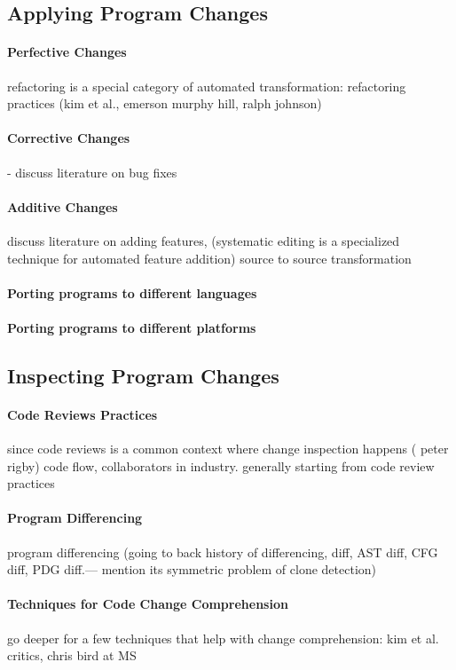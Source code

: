 \documentclass[runningheads,a4paper]{llncs}
\begin{document}
\subsection{Applying Program Changes}
\paragraph{Perfective Changes} 
	refactoring is a special category of automated transformation: refactoring practices (kim et al., emerson murphy hill, ralph johnson) 
\paragraph{Corrective Changes} 
	- discuss literature on bug fixes  
\paragraph{Additive Changes}
discuss literature on adding features, (systematic editing is a specialized technique for automated feature addition) source to source transformation 
\paragraph{Porting programs to different languages} 
\paragraph{Porting programs to different platforms} 

\subsection{Inspecting Program Changes}

\paragraph{Code Reviews Practices}
since code reviews is a common context where change inspection happens ( peter rigby)  code flow, collaborators in industry. generally starting from code review practices
\paragraph{Program Differencing} 
program differencing (going to back history of differencing, diff, AST diff, CFG diff, PDG diff.--- mention its symmetric problem of clone detection)
\paragraph{Techniques for Code Change Comprehension} 
go deeper for a few techniques that help with change comprehension: kim et al. critics, chris bird at MS
\end{document}
